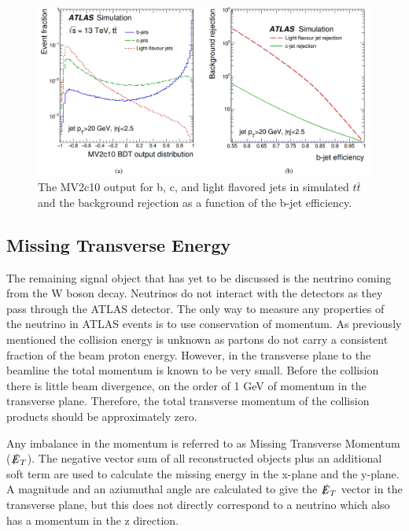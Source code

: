 \begin{figure}[h!]
	\centering
	\includegraphics[width=\columnwidth]{../ThesisImages/Simulation/BTagMV2c10andRejVsEff.png}
	\caption[The MV2c10 output for b, c, and light flavored jets in simulated $t\bar{t}$ and the background rejection as a function of the b-jet efficiency.]{The MV2c10 output for b, c, and light flavored jets in simulated $t\bar{t}$ and the background rejection as a function of the b-jet efficiency\cite{BJetMVA}.
	}
	\label{fig:BTag}
\end{figure}


\label{sec:bjetReco}

\subsection{Missing Transverse Energy}
The remaining signal object that has yet to be discussed is the neutrino coming from the W boson decay.  Neutrinos do not interact with the detectors as they pass through the ATLAS detector.  The only way to measure any properties of the neutrino in ATLAS events is to use conservation of momentum.  As previously mentioned the collision energy is unknown as partons do not carry a consistent fraction of the beam proton energy.  However, in the transverse plane to the beamline the total momentum is known to be very small.  Before the collision there is little beam divergence, on the order of 1 GeV of momentum in the transverse plane.  Therefore, the total transverse momentum of the collision products should be approximately zero.

Any imbalance in the momentum is referred to as Missing Transverse Momentum ($\slashed{E}_T$).  The negative vector sum of all reconstructed objects plus an additional soft term are used to calculate the missing energy in the x-plane and the y-plane\cite{METreco}.  A magnitude and an aziumuthal angle are calculated to give the \textbf{$\slashed{E}_T$} vector in the transverse plane, but this does not directly correspond to a neutrino which also has a momentum in the z direction.

